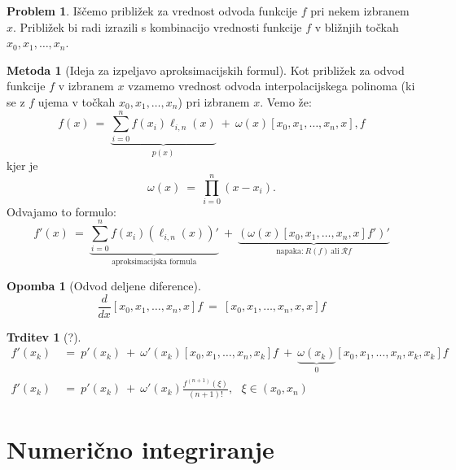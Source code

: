 \documentclass[11pt]{article}
\newcommand{\rr}{\mathcal{R}}
\theoremstyle{definition}
\theoremstyle{definition}
\newtheorem{problem}{Problem}[section]
\newtheorem{trditev}{Trditev}[section]
\newtheorem*{opomba}{Opomba}
\newtheorem*{metoda}{Metoda}
\begin{document}
\begin{problem}

Iščemo približek za vrednost odvoda funkcije $f$ pri nekem izbranem $x$. Približek bi radi izrazili s kombinacijo vrednosti funkcije $f$ v bližnjih točkah $x_0, x_1, \ldots, x_n$.

\end{problem}
\vspace{0.5cm}

\begin{metoda}[Ideja za izpeljavo aproksimacijskih formul]

Kot približek za \hbox{odvod} funkcije $f$ v izbranem $x$ vzamemo vrednost odvoda interpolacijskega \hbox{polinoma} (ki se z $f$ ujema v točkah $x_0, x_1, \ldots, x_n$) pri izbranem $x$. Vemo že:
$$f(x) ~=~ \underbrace{\sum_{i=0}^n f(x_i) \ell_{i, n}(x)}_{p(x)} ~+~ \omega(x)[x_0, x_1, \ldots, x_n, x],f$$
kjer je
$$\omega(x) ~=~ \prod_{i=0}^n (x-x_i).$$
Odvajamo to formulo:
$$f'(x) ~=~ \underbrace{\sum_{i=0}^n f(x_i) (\ell_{i, n}(x))'}_{\text{aproksimacijska formula}} ~+~ \underbrace{(\omega(x) [x_0, x_1, \ldots, x_n, x] f')'}_{\text{napaka:}~R(f)~\text{ali}~\rr f}$$ 

\end{metoda}
\vspace{0.5cm}

\begin{opomba}[Odvod deljene diference]

$$\frac{d}{dx}[x_0, x_1, \ldots, x_n, x]f ~=~ [x_0, x_1, \ldots, x_n, x, x]f$$

\end{opomba}
\vspace{0.5cm}

\begin{trditev}[?]
\begin{align*}
f'(x_k) ~&=~ p'(x_k) ~+~ \omega'(x_k)[x_0, x_1, \ldots, x_n, x_k]f ~+~ \underbrace{\omega(x_k)}_{0} [x_0, x_1, \ldots, x_n, x_k, x_k]f \\
f'(x_k) ~&=~ p'(x_k) ~+~ \omega'(x_k) \frac{f^{(n+1)}(\xi)}{(n+1)!}, ~~~\xi \in (x_0, x_n)
\end{align*}
\end{trditev}
\vspace{0.5cm}

\pagebreak


\section{Numerično integriranje}
\vspace{0.5cm}
\end{document}
